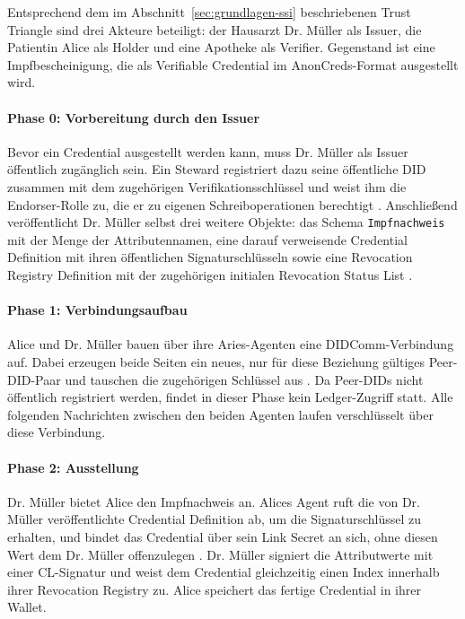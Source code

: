 Entsprechend dem im Abschnitt~\ref{sec:grundlagen-ssi} beschriebenen Trust Triangle sind drei Akteure beteiligt: der Hausarzt Dr. Müller als Issuer, die Patientin Alice als Holder und eine Apotheke als Verifier. Gegenstand ist eine Impfbescheinigung, die als Verifiable Credential im AnonCreds-Format ausgestellt wird.

\paragraph{Phase 0: Vorbereitung durch den Issuer}
Bevor ein Credential ausgestellt werden kann, muss Dr. Müller als Issuer öffentlich zugänglich sein. Ein Steward registriert dazu seine öffentliche DID zusammen mit dem zugehörigen Verifikationsschlüssel und weist ihm die Endorser-Rolle zu, die er zu eigenen Schreiboperationen berechtigt \cite{torongo2023}. Anschließend veröffentlicht Dr. Müller selbst drei weitere Objekte: das Schema \texttt{Impfnachweis} mit der Menge der Attributennamen, eine darauf verweisende Credential Definition mit ihren öffentlichen Signaturschlüsseln sowie eine Revocation Registry Definition mit der zugehörigen initialen Revocation Status List \cite{anoncredsspec}.

\paragraph{Phase 1: Verbindungsaufbau}
Alice und Dr. Müller bauen über ihre Aries-Agenten eine DIDComm-Verbindung auf. Dabei erzeugen beide Seiten ein neues, nur für diese Beziehung gültiges Peer-DID-Paar und tauschen die zugehörigen Schlüssel aus \cite{mazzocca2025}. Da Peer-DIDs nicht öffentlich registriert werden, findet in dieser Phase kein Ledger-Zugriff statt. Alle folgenden Nachrichten zwischen den beiden Agenten laufen verschlüsselt über diese Verbindung.

\paragraph{Phase 2: Ausstellung}
Dr. Müller bietet Alice den Impfnachweis an. Alices Agent ruft die von Dr. Müller veröffentlichte Credential Definition ab, um die Signaturschlüssel zu erhalten, und bindet das Credential über sein Link Secret an sich, ohne diesen Wert dem Dr. Müller offenzulegen \cite{anoncredsspec}. Dr. Müller signiert die Attributwerte mit einer CL-Signatur und weist dem Credential gleichzeitig einen Index innerhalb ihrer Revocation Registry zu. Alice speichert das fertige Credential in ihrer Wallet. 


